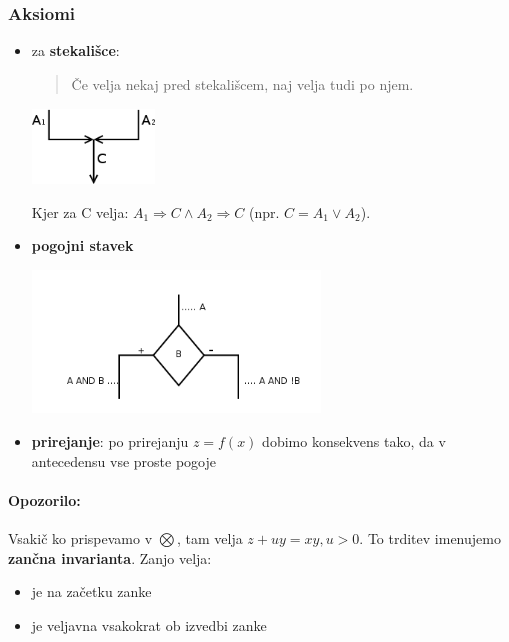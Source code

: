 \documentclass[a4paper,10pt]{article}
\begin{document}
\subsubsection{Aksiomi}
\begin{itemize}
\item za \textbf{stekali\v sce}:
	\begin{quote}
	\v Ce velja nekaj pred stekali\v scem, naj velja tudi po njem.
	\end{quote}
	\begin{center}
	\includegraphics[width=3.25cm,height=2cm]{Slike/Stekalisce.png}
	\end{center}
	Kjer za C velja: $A_1\Rightarrow C \wedge A_2 \Rightarrow C$ (npr. $C = A_1 \vee A_2$).
\item \textbf{pogojni stavek}
	\begin{center}
	\includegraphics[width=7.65cm,height=3.8cm]{Slike/PogojniStavek.png}
	\end{center}

\item \textbf{prirejanje}: po prirejanju $z=f(x)$ dobimo konsekvens tako, da v antecedensu vse proste pogoje
\end{itemize}

\paragraph{Opozorilo:}
Vsaki\v c ko prispevamo v $\bigotimes$, tam velja $z + uy = xy, u>0$. To trditev imenujemo \textbf{zan\v cna invarianta}. Zanjo velja:
\begin{itemize}
\item je na za\v cetku zanke
\item je veljavna vsakokrat ob izvedbi zanke
\end{itemize}
\end{document}
